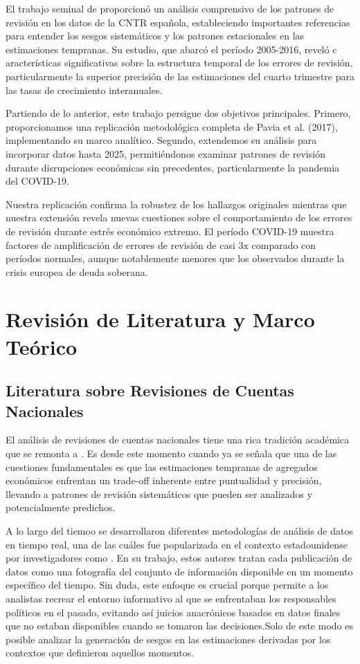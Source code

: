 \documentclass{article}
\begin{document}
El trabajo seminal de \citet{pavia2017} proporcionó un análisis comprensivo de los patrones de revisión en los datos de la CNTR española, estableciendo importantes referencias para entender los sesgos sistemáticos y los patrones estacionales en las estimaciones tempranas. Su estudio, que abarcó el período 2005-2016, reveló c aracterísticas significativas sobre la estructura temporal de los errores de revisión, particularmente la superior precisión de las estimaciones del cuarto trimestre para las tasas de crecimiento interanuales.

Partiendo de lo anterior, este trabajo persigue dos objetivos principales. Primero, proporcionamos una replicación metodológica completa de Pavia et al. (2017), implementando su marco analítico. Segundo, extendemos su análisis para incorporar datos hasta 2025, permitiéndonos examinar patrones de revisión durante disrupciones económicas sin precedentes, particularmente la pandemia del COVID-19.

Nuestra replicación confirma la robustez de los hallazgos originales mientras que nuestra extensión revela nuevas cuestiones sobre el comportamiento de los errores de revisión durante estrés económico extremo. El período COVID-19 muestra factores de amplificación de errores de revisión de casi 3x comparado con períodos normales, aunque notablemente menores que los observados durante la crisis europea de deuda soberana.

\section{Revisión de Literatura y Marco Teórico}

\subsection{Literatura sobre Revisiones de Cuentas Nacionales}

El análisis de revisiones de cuentas nacionales tiene una rica tradición académica que se remonta a \citet{young1993}. Es desde este momento cuando ya se señala que una de las cuestiones fundamentales es que las estimaciones tempranas de agregados económicos enfrentan un trade-off inherente entre puntualidad y precisión, llevando a patrones de revisión sistemáticos que pueden ser analizados y potencialmente predichos.

A lo largo del tiemoo se desarrollaron diferentes metodologías de análisis de datos en tiempo real, una de las cuáles fue popularizada en el contexto estadounidense por investigadores como \citet{croushore2001}. En su trabajo, estos autores tratan cada publicación de datos como una fotografía del conjunto de información disponible en un momento específico del tiempo. Sin duda, este enfoque es crucial porque permite a los analistas recrear el entorno informativo al que se enfrentaban los responsables políticos en el pasado, evitando así juicios anacrónicos basados en datos finales que no estaban disponibles cuando se tomaron las decisiones.Solo de este modo es posible analizar la generación de sesgos en las estimaciones derivadas por los contextos que definieron aquellos momentos.
\end{document}
